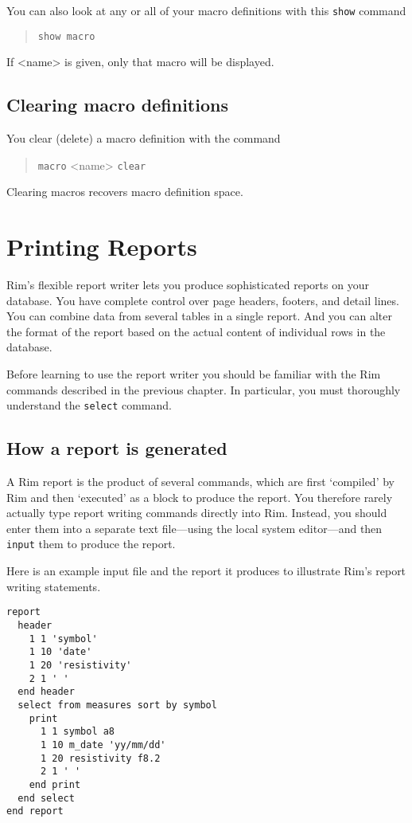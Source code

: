 \documentclass[11pt,a4paper]{report}
\begin{document}
You can also look at any or all of your macro definitions
with this \verb!show! command
\begin{verse}
  \verb!show macro! 
\end{verse}
If <name> is given, only that macro will be displayed.
 
\section{Clearing macro definitions}
You clear (delete) a macro definition with the command
\begin{verse}
  \verb!macro! <name> \verb!clear!
\end{verse}
Clearing macros recovers macro definition space.

 
%
%
\def\demobreak{\par\pagebreak[3]\bigskip}

%
\chapter{Printing Reports}
%
\label{report-writer}
Rim's flexible report writer lets you produce
sophisticated reports on your database.
You have complete control over page headers, footers,
and detail lines.  You can combine data from several tables
in a single report. And you can alter the format of the
report based on the actual content of individual rows
in the database.
 
Before learning to use the report writer you should be
familiar with the Rim commands described in the previous chapter.
In particular, you must
thoroughly understand the \verb!select! command.
 
\section{How a report is generated}
%
A Rim report is the product of several commands, which are first
`compiled' by Rim and then `executed' as a block to produce the report.
You therefore rarely actually type report writing commands
directly into Rim.  Instead, you should enter them into a separate
text file---using the local system editor---and then \verb!input! them
to produce the report.
 
 
Here is an example input file and the report it produces to
illustrate Rim's report writing statements.
\demobreak
\begin{verbatim}
report
  header
    1 1 'symbol'
    1 10 'date'
    1 20 'resistivity'
    2 1 ' '
  end header
  select from measures sort by symbol
    print
      1 1 symbol a8
      1 10 m_date 'yy/mm/dd'
      1 20 resistivity f8.2
      2 1 ' '
    end print
  end select
end report
\end{verbatim}
 
\end{document}
